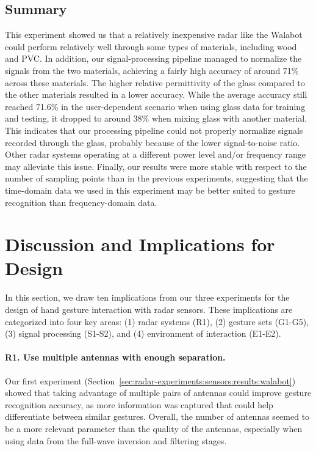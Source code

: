 \subsection{Summary} \label{sec:radar-experiments:through-materials:discussion}
This experiment showed us that a relatively inexpensive radar like the Walabot could perform relatively well through some types of materials, including wood and PVC. In addition, our signal-processing pipeline managed to normalize the signals from the two materials, achieving a fairly high accuracy of around 71\% across these materials.
%
The higher relative permittivity of the glass compared to the other materials resulted in a lower accuracy. While the average accuracy still reached 71.6\% in the user-dependent scenario when using glass data for training and testing, it dropped to around 38\% when mixing glass with another material. This indicates that our processing pipeline could not properly normalize signals recorded through the glass, probably because of the lower signal-to-noise ratio. Other radar systems operating at a different power level and/or frequency range may alleviate this issue.
%
Finally, our results were more stable with respect to the number of sampling points than in the previous experiments, suggesting that the time-domain data we used in this experiment may be better suited to gesture recognition than frequency-domain data.

\section{Discussion and Implications for Design} \label{sec:radar-experiments:discussion}
In this section, we draw ten implications from our three experiments for the design of hand gesture interaction with radar sensors. These implications are categorized into four key areas: (1) radar systems (R1), (2) gesture sets (G1-G5), (3) signal processing (S1-S2), and (4) environment of interaction (E1-E2).

\paragraph{R1. Use multiple antennas with enough separation.}
Our first experiment (Section~\ref{sec:radar-experiments:sensors:results:walabot}) showed that taking advantage of multiple pairs of antennas could improve gesture recognition accuracy, as more information was captured that could help differentiate between similar gestures. Overall, the number of antennas seemed to be a more relevant parameter than the quality of the antennas, especially when using data from the full-wave inversion and filtering stages. 

